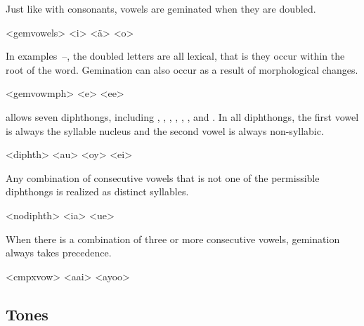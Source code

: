Just like with consonants, vowels are geminated when they are doubled.

\pex<gemvowels>
	    
	    
	    
\xe

In examples~--, the doubled letters are all lexical, that is they occur within the root of the word. Gemination can also occur as a result of morphological changes.

\pex<gemvowmph>
	    
	\a<ee>    
\xe

\lang{} allows seven diphthongs, including , , , , , , and . In all diphthongs, the first vowel is always the syllable nucleus and the second vowel is always non-syllabic.

\pex<diphth>
	\a<au>    
	\a<oy>    
	\a<ei>    
\xe

Any combination of consecutive vowels that is not one of the permissible diphthongs is realized as distinct syllables.

\pex<nodiphth>
	\a<ia>    
	\a<ue>    
\xe

When there is a combination of three or more consecutive vowels, gemination always takes precedence.

\pex<cmpxvow>
	\a<aai> \ljudge{\excl}    
	\a<ayoo>    
\xe


\subsection{Tones}
\label{sec:tones}

